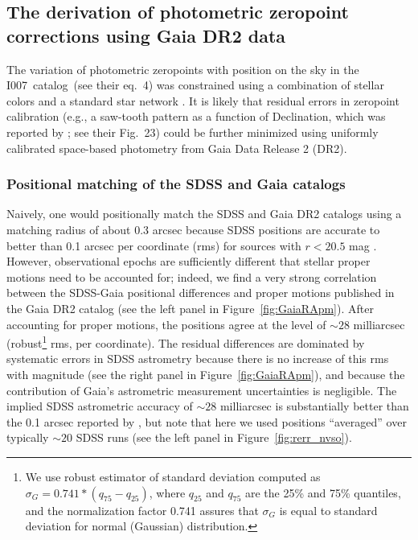 \documentclass[fleqn,usenatbib]{mnras}
\newcommand{\pOc}{\hbox{I007 catalog}}
\begin{document}

\subsection{The derivation of  photometric zeropoint corrections using Gaia DR2 data\label{sec:GaiaCorr}} 

The variation of photometric zeropoints with position on the sky in the \pOc\ (see their eq.~4) was 
constrained using a combination of stellar colors \citep[the principal axes in color-color diagrams, for details 
see][]{2004AN....325..583I} and a standard star network \citep{2002AJ....123.2121S,2006AN....327..821T}. It is likely that 
residual errors in zeropoint calibration (e.g., a saw-tooth pattern as a function of Declination,
which was reported by \citealt{2013A&A...552A.124B}; see their Fig.~23) could be further minimized using 
uniformly calibrated space-based photometry from Gaia Data Release 2 (DR2). 

\subsubsection{Positional matching of the SDSS and Gaia catalogs}
Naively, one would positionally match the SDSS and Gaia DR2 catalogs using a matching radius of 
about 0.3 arcsec because SDSS positions are accurate to better than 0.1 arcsec per coordinate (rms) 
for sources with $r < 20.5$ mag \citep{2003AJ....125.1559P}.  However, observational epochs are
sufficiently different that stellar proper motions need to be accounted for; indeed, we find a very 
strong correlation between the SDSS-Gaia positional differences and proper motions published in 
the Gaia DR2 catalog (see the left panel in  Figure~\ref{fig:GaiaRApm}). After accounting for proper
motions,  the positions agree at the level of $\sim28$ milliarcsec (robust\footnote{We use robust estimator 
of standard deviation computed as $\sigma_G = 0.741*(q_{75}-q_{25})$, where $q_{25}$ and $q_{75}$ are 
the 25\% and 75\% quantiles, and the normalization factor 0.741 assures that $\sigma_G$ is equal to 
standard deviation for normal (Gaussian) distribution.}
rms, per coordinate). The 
residual differences are dominated by systematic errors in SDSS astrometry because there is
no increase of this rms with magnitude (see the right panel in Figure~\ref{fig:GaiaRApm}), and
because the contribution of Gaia's astrometric measurement uncertainties is negligible. 
The implied SDSS astrometric accuracy of $\sim28$ milliarcsec is substantially better than 
the 0.1 arcsec reported by \cite{2003AJ....125.1559P}, but note that here we used 
positions ``averaged'' over typically $\sim20$ SDSS runs (see the left panel in Figure~\ref{fig:rerr_nvso}). 
\end{document}
